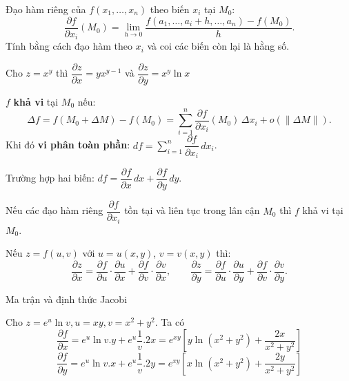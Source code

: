 \documentclass[12pt,a4paper]{article}
\begin{document}
\begin{dinhnghia}[title={Đạo hàm riêng}]
  Đạo hàm riêng của $f(x_1, \ldots, x_n)$ theo biến $x_i$ tại $M_0$:
  \[
    \dfrac{\partial f}{\partial x_i}(M_0) = \lim_{h \to 0} \dfrac{f(a_1, \ldots, a_i + h, \ldots, a_n) - f(M_0)}{h}.
  \]
  Tính bằng cách đạo hàm theo $x_i$ và coi các biến còn lại là hằng số.
\end{dinhnghia}

\begin{vidu}
    Cho $z = x^y$ thì $\dfrac{\partial z}{ \partial x} = yx^{y - 1}$ và $\dfrac{\partial z}{ \partial y} = x^y \ln x$
\end{vidu}

\begin{dinhnghia}[title={Vi phân toàn phần}]
  $f$ \textbf{khả vi} tại $M_0$ nếu:
  \[
    \Delta f = f(M_0 + \Delta M) - f(M_0) = \sum_{i=1}^{n} \dfrac{\partial f}{\partial x_i}(M_0)\,\Delta x_i + o(\|\Delta M\|).
  \]
  Khi đó \textbf{vi phân toàn phần}: $df = \displaystyle\sum_{i=1}^{n} \dfrac{\partial f}{\partial x_i}\,dx_i$.

  Trường hợp hai biến: $df = \dfrac{\partial f}{\partial x}\,dx + \dfrac{\partial f}{\partial y}\,dy$.
\end{dinhnghia}

\begin{dinhly}
  Nếu các đạo hàm riêng $\dfrac{\partial f}{\partial x_i}$ tồn tại và liên tục trong lân cận $M_0$ thì $f$ khả vi tại $M_0$.
\end{dinhly}

\begin{dinhly}[title={Đạo hàm hàm hợp (Chain rule)}]
  Nếu $z = f(u, v)$ với $u = u(x, y)$, $v = v(x, y)$ thì:
  \[
    \dfrac{\partial z}{\partial x} = \dfrac{\partial f}{\partial u}\cdot\dfrac{\partial u}{\partial x} + \dfrac{\partial f}{\partial v}\cdot\dfrac{\partial v}{\partial x}, \qquad
    \dfrac{\partial z}{\partial y} = \dfrac{\partial f}{\partial u}\cdot\dfrac{\partial u}{\partial y} + \dfrac{\partial f}{\partial v}\cdot\dfrac{\partial v}{\partial y}.
  \]
\end{dinhly}

Ma trận và định thức Jacobi

\begin{vidu}
    Cho $z = e^u \ln v, u = xy, v = x^2 + y^2$. Ta có
    \[
    \dfrac{\partial f}{\partial x} = e^u \ln v .y + e^u \dfrac{1}{v}.2x = e^{xy}[y \ln (x^2 + y^2) + \dfrac{2x}{x^2 + y^2}]
    \]
    \[
    \dfrac{\partial f}{\partial y} = e^u \ln v . x + e^u \dfrac{1}{v}.2y = e^{xy}[x \ln (x^2 + y^2) + \dfrac{2y}{x^2 + y^2}]
    \]
\end{vidu}
\end{document}
